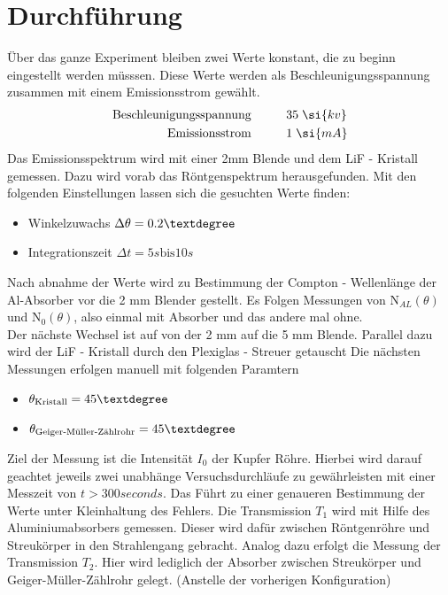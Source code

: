 \section{Durchführung}
Über das ganze Experiment bleiben zwei Werte konstant, die zu beginn eingestellt werden müsssen.
Diese Werte werden als Beschleunigungsspannung zusammen mit einem Emissionsstrom gewählt. 
\begin{align*}
\text{Beschleunigungsspannung} &  \hspace{1 cm} 35 \hspace{0.1 cm}\si{kv} \\
\text{Emissionsstrom} &  \hspace{1 cm}   1 \hspace{0.1 cm} \si{mA}\\
\end{align*}
Das Emissionsspektrum wird mit einer 2mm Blende und dem LiF - Kristall gemessen. 
Dazu wird vorab das Röntgenspektrum herausgefunden. Mit den folgenden Einstellungen lassen sich die gesuchten Werte finden:
\begin{itemize}
\item{Winkelzuwachs $\Delta \theta = 0.2 \textdegree$}
\item{Integrationszeit $\Delta t = 5 \si{s} \text{bis} 10 \si{s}$}
\end{itemize}
Nach abnahme der Werte wird zu Bestimmung der Compton - Wellenlänge der Al-Absorber vor die 2 mm Blender gestellt.
Es Folgen Messungen von $\text{N}_{AL}(\theta)$ und $\text{N}_{0}(\theta)$, also einmal mit Absorber und das andere mal ohne.
\\
\newline
Der nächste Wechsel ist auf von der 2 mm  auf die 5 mm Blende. Parallel dazu wird der LiF - Kristall durch den Plexiglas - Streuer getauscht
Die nächsten Messungen erfolgen manuell mit folgenden Paramtern
\begin{itemize}
\item{$\theta_{\text{Kristall}}  = 45 \textdegree$}
\item{$\theta_{\text{Geiger-Müller-Zählrohr}}  = 45 \textdegree$}
\end{itemize}
Ziel der Messung ist die Intensität $I_0$ der Kupfer Röhre.
Hierbei wird darauf geachtet jeweils zwei unabhänge Versuchsdurchläufe zu gewährleisten mit einer Messzeit von $t > \si{300}{seconds}$.
Das Führt zu einer genaueren Bestimmung der Werte unter Kleinhaltung des Fehlers.
Die Transmission $T_1$ wird mit Hilfe des Aluminiumabsorbers gemessen. Dieser wird dafür zwischen Röntgenröhre und Streukörper in den Strahlengang
gebracht. Analog dazu erfolgt die Messung der Transmission $T_2$. Hier wird lediglich der Absorber zwischen Streukörper und Geiger-Müller-Zählrohr gelegt. (Anstelle der vorherigen Konfiguration)